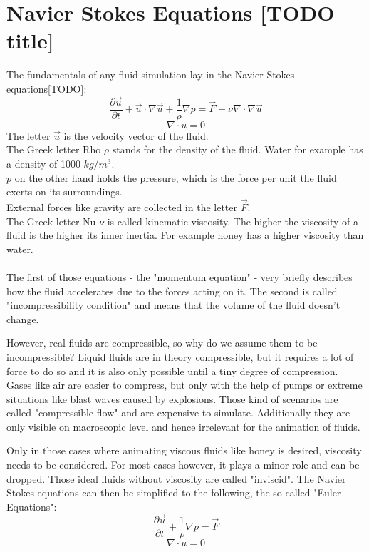 \chapter{Navier Stokes Equations [TODO title]}\label{chapter:cudapressuresolver}

The fundamentals of any fluid simulation lay in the Navier Stokes equations[TODO]:\\
\begin{equation} \label{navier-stokes1}
\frac{\partial \vec{u}}{\partial t} + \vec{u} \cdot \nabla \vec{u} + \frac{1}{\rho}  \nabla p = \vec{F} + \nu \nabla \cdot \nabla \vec{u}
\end{equation}
\begin{equation} \label{navier-stokes2}
\nabla \cdot u = 0
\end{equation}
The letter $\vec{u}$ is the velocity vector of the fluid.\\
The Greek letter Rho $\rho$ stands for the density of the fluid. Water for example has a density of 1000 $kg/m^3$. \\
$p$ on the other hand holds the pressure, which is the force per unit the fluid exerts on its surroundings.\\
External forces like gravity are collected in the letter $\vec{F}$.\\
The Greek letter Nu $\nu$ is called kinematic viscosity. The higher the viscosity of a fluid is the higher its inner inertia. For example honey has a higher viscosity than water.\\\\
The first of those equations - the "momentum equation" - very briefly describes how the fluid accelerates due to the forces acting on it. The second is called "incompressibility condition" and means that the volume of the fluid doesn't change.
\par However, real fluids are compressible, so why do we assume them to be incompressible? Liquid fluids are in theory compressible, but it requires a lot of force to do so and it is also only possible until a tiny degree of compression. Gases like air are easier to compress, but only with the help of pumps or extreme situations like blast waves caused by explosions. Those kind of scenarios are called "compressible flow" and are expensive to simulate. Additionally they are only visible on macroscopic level and hence irrelevant for the animation of fluids.
\par Only in those cases where animating viscous fluids like honey is desired, viscosity needs to be considered. For most cases however, it plays a minor role and can be dropped. Those ideal fluids without viscosity are called "inviscid". The Navier Stokes equations can then be simplified to the following, the so called "Euler Equations":
\begin{equation} \label{navier-stokes12}
\frac{\partial \vec{u}}{\partial t} + \frac{1}{\rho}  \nabla p = \vec{F}
\end{equation}
\begin{equation} \label{navier-stokes22}
\nabla \cdot u = 0
\end{equation}

